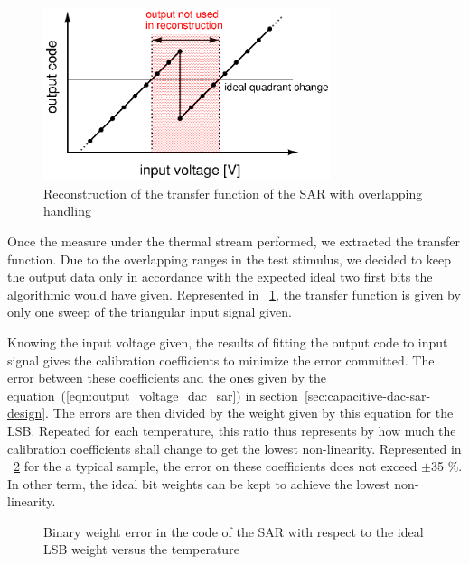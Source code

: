 \begin{figure}[htp]
    \centering
    \includegraphics[width=0.75\textwidth]{Chapter5/Figs/sar_test/sar-tf-overlapp.ps}
    \caption{Reconstruction of the transfer function of the SAR with overlapping handling}
    \label{fig:sar-tf-overlap}
\end{figure}

Once the measure under the thermal stream performed, we extracted the transfer function. Due to the overlapping ranges in the test stimulus, we decided to keep the output data only in accordance with the expected ideal two first bits the algorithmic would have given. Represented in \figurename~\ref{fig:sar-tf-overlap}, the transfer function is given by only one sweep of the triangular input signal given.

Knowing the input voltage given, the results of fitting the output code to input signal gives the calibration coefficients to minimize the error committed. The error between these coefficients and the ones given by the equation~(\ref{eqn:output_voltage_dac_sar}) in section~\ref{sec:capacitive-dac-sar-design}. The errors are then divided by the weight given by this equation for the LSB\@.
Repeated for each temperature, this ratio thus represents by how much the calibration coefficients shall change to get the lowest non-linearity. Represented in \figurename~\ref{fig:sar-test-coef_doe05_11} for the a typical sample, the error on these coefficients does not exceed $\pm$35 \%. In other term, the ideal bit weights can be kept to achieve the lowest non-linearity.

\begin{figure}[htp]
    \centering
    
    \caption{Binary weight error in the code of the SAR with respect to the ideal LSB weight versus the temperature}
    \label{fig:sar-test-coef_doe05_11}
\end{figure}

